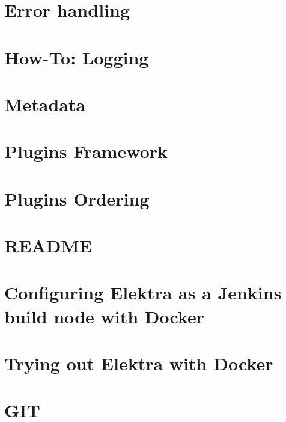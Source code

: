 \documentclass[twoside]{book}
\newcommand{\+}{\discretionary{\mbox{\scriptsize$\hookleftarrow$}}{}{}}
\begin{document}
\chapter{Error handling}
\label{doc_dev_error-handling_md}

\chapter{How-\/\+To\+: Logging}
\label{doc_dev_logging_md}

\chapter{Metadata}
\label{doc_dev_metadata_md}

\chapter{Plugins Framework}
\label{doc_dev_plugins-framework_md}

\chapter{Plugins Ordering}
\label{doc_dev_plugins-ordering_md}

\chapter{R\+E\+A\+D\+ME}
\label{md_doc_dev_README}

\chapter{Configuring Elektra as a Jenkins build node with Docker}
\label{doc_docker_jenkinsnode_README_md}

\chapter{Trying out Elektra with Docker}
\label{doc_docker_README_md}

\chapter{G\+IT}
\label{doc_GIT_md}

\end{document}
